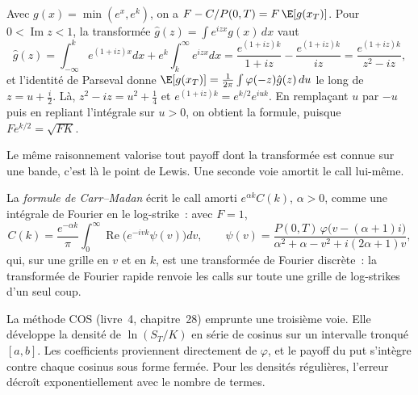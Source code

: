 \begin{proposition}[Démonstration]\label{prop:dv:fourier-pricing-and-calibration-engineering:lewis}
Avec $g(x)=\min(e^x,e^k)$, on a $F-C/P(0,T)=F\,\E[g(x_T)]$. Pour $0<\operatorname{Im}z<1$, la transformée $\hat g(z)=\int e^{izx}g(x)\,dx$ vaut
\[
\hat g(z)=\int_{-\infty}^k e^{(1+iz)x}dx+e^k\int_k^\infty e^{izx}dx=\frac{e^{(1+iz)k}}{1+iz}-\frac{e^{(1+iz)k}}{iz}=\frac{e^{(1+iz)k}}{z^2-iz},
\]
et l'identité de Parseval donne $\E[g(x_T)]=\frac1{2\pi}\int\varphi(-z)\hat g(z)\,du$ le long de $z=u+\frac i2$. Là, $z^2-iz=u^2+\frac14$ et
$e^{(1+iz)k}=e^{k/2}e^{iuk}$. En remplaçant $u$ par $-u$ puis en repliant l'intégrale sur $u>0$, on obtient la formule, puisque $Fe^{k/2}=\sqrt{FK}$.
\end{proposition}

Le même raisonnement valorise tout payoff dont la transformée est connue sur une bande, c'est là le point de Lewis. Une seconde voie amortit le call lui-même.

\begin{definition}\label{def:dv:fourier-pricing-and-calibration-engineering:cm}
La \emph{formule de Carr--Madan} écrit le call amorti $e^{\alpha k}C(k)$, $\alpha>0$, comme une intégrale de
Fourier en le log-strike~: avec $F=1$,
\[
C(k)=\frac{e^{-\alpha k}}{\pi}\int_0^\infty\operatorname{Re}\bigl(e^{-ivk}\psi(v)\bigr)dv,\qquad
\psi(v)=\frac{P(0,T)\,\varphi\bigl(v-(\alpha+1)i\bigr)}{\alpha^2+\alpha-v^2+i(2\alpha+1)v},
\]
qui, sur une grille en $v$ et en $k$, est une transformée de Fourier discrète~: la transformée de Fourier rapide renvoie les calls sur
toute une grille de log-strikes d'un seul coup.
\end{definition}

La méthode COS (livre~4, chapitre~28) emprunte une troisième voie. Elle développe la densité de $\ln(S_T/K)$ en série de cosinus sur un
intervalle tronqué $[a,b]$. Les coefficients proviennent directement de $\varphi$, et le payoff du put s'intègre contre chaque cosinus sous forme fermée.
Pour les densités régulières, l'erreur décroît exponentiellement avec le nombre de termes.

